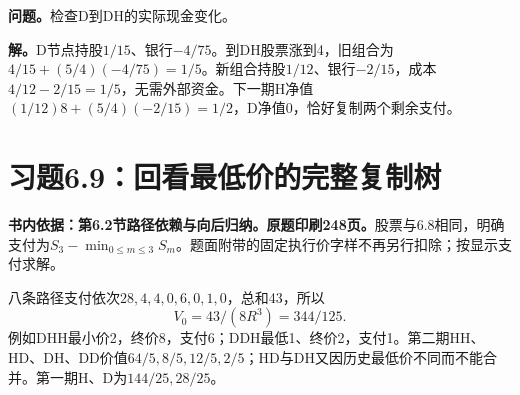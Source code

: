 \documentclass[11pt,a4paper,UTF8,fontset=fandol]{ctexart}
\begin{document}
\textbf{问题。}检查D到DH的实际现金变化。

\textbf{解。}D节点持股\(1/15\)、银行\(-4/75\)。到DH股票涨到4，旧组合为\(4/15+(5/4)(-4/75)=1/5\)。新组合持股\(1/12\)、银行\(-2/15\)，成本\(4/12-2/15=1/5\)，无需外部资金。下一期H净值\((1/12)8+(5/4)(-2/15)=1/2\)，D净值0，恰好复制两个剩余支付。

\bigskip

\section{习题6.9：回看最低价的完整复制树}\label{ux4e60ux98986.9ux56deux770bux6700ux4f4eux4ef7ux7684ux5b8cux6574ux590dux5236ux6811}

\textbf{书内依据：第6.2节路径依赖与向后归纳。原题印刷248页。}股票与6.8相同，明确支付为\(S_3-\min_{0\le m\le3}S_m\)。题面附带的固定执行价字样不再另行扣除；按显示支付求解。

八条路径支付依次\(28,4,4,0,6,0,1,0\)，总和43，所以
\[\boxed{V_0=43/(8R^3)=344/125.}\]
例如DHH最小价2，终价8，支付6；DDH最低1、终价2，支付1。第二期HH、HD、DH、DD价值\(64/5,8/5,12/5,2/5\)；HD与DH又因历史最低价不同而不能合并。第一期H、D为\(144/25,28/25\)。

\begingroup
\small
\setlength{\tabcolsep}{4pt}
\renewcommand{\arraystretch}{1.10}
\end{document}
